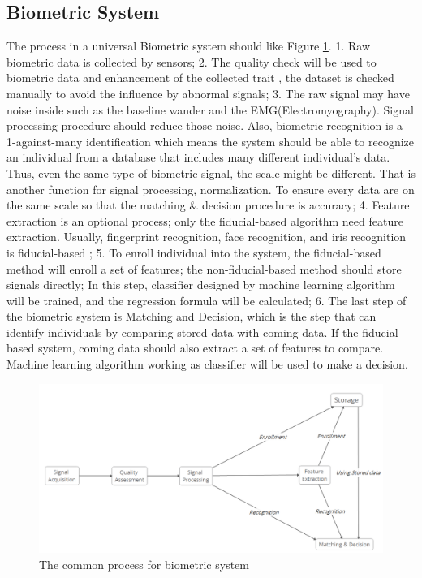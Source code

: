 \documentclass[a4paper,12pt]{article}
\begin{document}
\subsection{Biometric System}
The process in a universal Biometric system should like Figure \ref{fig:common_process}. 1. Raw biometric data is collected by sensors; 2. The quality check will be used to biometric data and enhancement of the collected trait \autocite{Pinto:2018evolution}, the dataset is checked manually to avoid the influence by abnormal signals; 3. The raw signal may have noise inside such as the baseline wander and the EMG(Electromyography). Signal processing procedure should reduce those noise. Also, biometric recognition is a 1-against-many identification which means the system should be able to recognize an individual from a database that includes many different individual's data. Thus, even the same type of biometric signal, the scale might be different. That is another function for signal processing, normalization. To ensure every data are on the same scale so that the matching \& decision procedure is accuracy; 4. Feature extraction is an optional process; only the fiducial-based algorithm need feature extraction. Usually, fingerprint recognition, face recognition, and iris recognition is fiducial-based \autocite{Jain:2011bio}; 5. To enroll individual into the system, the fiducial-based method will enroll a set of features; the non-fiducial-based method should store signals directly; In this step, classifier designed by machine learning algorithm will be trained, and the regression formula will be calculated; 6. The last step of the biometric system is Matching and Decision, which is the step that can identify individuals by comparing stored data with coming data. If the fiducial-based system, coming data should also extract a set of features to compare. Machine learning algorithm working as classifier will be used to make a decision.

\begin{figure}[htbp]
\centering
\includegraphics[width = .8\textwidth]{common_bio_process.png}
\caption{The common process for biometric system}
\label{fig:common_process}
\end{figure}
\end{document}
